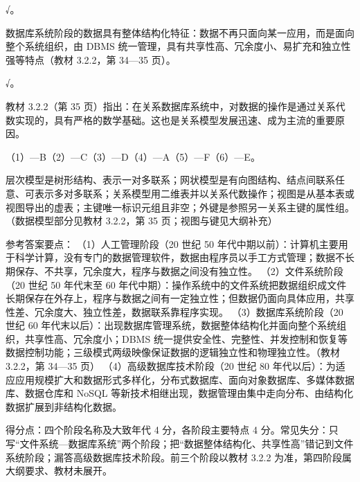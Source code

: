 \documentclass[a4paper,11pt]{article}
\begin{document}
\q √。\begin{analysis}数据库系统阶段的数据具有整体结构化特征：数据不再只面向某一应用，而是面向整个系统组织，由 DBMS 统一管理，具有共享性高、冗余度小、易扩充和独立性强等特点（教材 3.2.2，第 34—35 页）。\end{analysis}

\q √。\begin{analysis}教材 3.2.2（第 35 页）指出：在关系数据库系统中，对数据的操作是通过关系代数实现的，具有严格的数学基础。这也是关系模型发展迅速、成为主流的重要原因。\end{analysis}


\q （1）—B\quad （2）—C\quad （3）—D\quad （4）—A\quad （5）—F\quad （6）—E。
\begin{analysis}层次模型是树形结构、表示一对多联系；网状模型是有向图结构、结点间联系任意、可表示多对多联系；关系模型用二维表并以关系代数操作；视图是从基本表或视图导出的虚表；主键唯一标识元组且非空；外键是参照另一关系主键的属性组。（数据模型部分见教材 3.2.2，第 35 页；视图与键见大纲补充）\end{analysis}


\q 参考答案要点：
（1）人工管理阶段（20 世纪 50 年代中期以前）：计算机主要用于科学计算，没有专门的数据管理软件，数据由程序员以手工方式管理；数据不长期保存、不共享，冗余度大，程序与数据之间没有独立性。
（2）文件系统阶段（20 世纪 50 年代末至 60 年代中期）：操作系统中的文件系统把数据组织成文件长期保存在外存上，程序与数据之间有一定独立性；但数据仍面向具体应用，共享性差、冗余度大、独立性差，数据联系靠程序实现。
（3）数据库系统阶段（20 世纪 60 年代末以后）：出现数据库管理系统，数据整体结构化并面向整个系统组织，共享性高、冗余度小；DBMS 统一提供安全性、完整性、并发控制和恢复等数据控制功能；三级模式两级映像保证数据的逻辑独立性和物理独立性。（教材 3.2.2，第 34—35 页）
（4）高级数据库技术阶段（20 世纪 80 年代以后）：为适应应用规模扩大和数据形式多样化，分布式数据库、面向对象数据库、多媒体数据库、数据仓库和 NoSQL 等新技术相继出现，数据管理由集中走向分布、由结构化数据扩展到非结构化数据。
\begin{analysis}得分点：四个阶段名称及大致年代 4 分，各阶段主要特点 4 分。常见失分：只写“文件系统—数据库系统”两个阶段；把“数据整体结构化、共享性高”错记到文件系统阶段；漏答高级数据库技术阶段。前三个阶段以教材 3.2.2 为准，第四阶段属大纲要求、教材未展开。\end{analysis}
\end{document}
